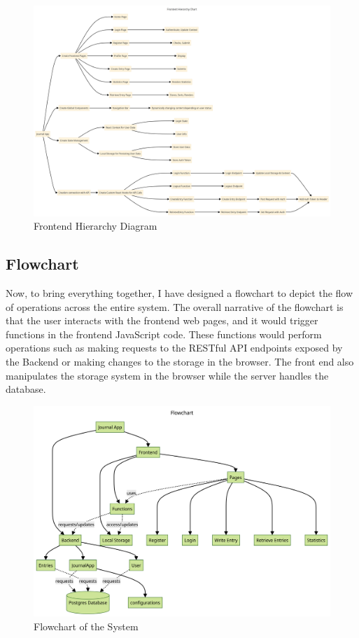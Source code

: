 \begin{landscape}
    \begin{figure}
        \centering
        \includegraphics[width=1\linewidth]{Assets/FrontendER.png}
        \caption{Frontend Hierarchy Diagram}
        \label{fig:frontendHD}
    \end{figure}
\end{landscape}

\subsection{Flowchart}
Now, to bring everything together, I have designed a flowchart to depict the flow of operations across the entire system. The overall narrative of the flowchart is that the user interacts with the frontend web pages, and it would trigger functions in the frontend JavaScript code. These functions would perform operations such as making requests to the RESTful API endpoints exposed by the Backend or making changes to the storage in the browser. The front end also manipulates the storage system in the browser while the server handles the database. 

\begin{figure}[h]
    \centering
    \includegraphics[width=5in]{Assets/Flowchart.png}
    \caption{Flowchart of the System}
    \label{fig:3.3}
\end{figure}

